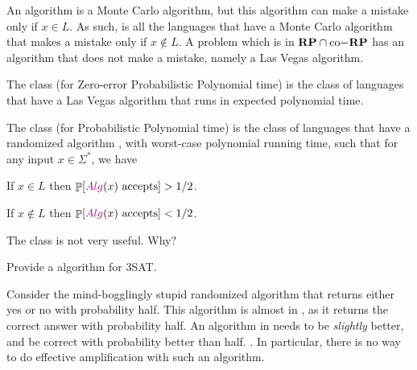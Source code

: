 An  algorithm is a Monte Carlo algorithm, but this
algorithm can make a mistake only if $x \in L$. As such, 
is all the languages that have a Monte Carlo algorithm that makes a
mistake only if $x \notin L$. A problem which is in $\mathbf{RP} \cap
\mathrm{co-}\mathbf{RP}$ has an algorithm that does not make a mistake, namely a
Las Vegas algorithm. 

\begin{defn}
    The class  (for Zero-error Probabilistic Polynomial
    time) is the class of languages that have a Las Vegas algorithm
    that runs in expected polynomial time.
\end{defn}


\begin{defn}
    The class \CClassPP (for Probabilistic Polynomial time) is the
    class of languages that have a randomized algorithm \Alg, with
    worst-case polynomial running time, such that for any input
    $x \in \Sigma^*$, we have
    \begin{compactenumi}
        \item If $x \in L$ then $\Prob{\MakeBig \Alg(x) \text{
              accepts}} > 1/2$.
     
        \item If $x \notin L$ then $\Prob{\MakeBig\Alg(x) \text{
              accepts}} < 1/2$.
    \end{compactenumi}
\end{defn}

The class \CClassPP is not very useful. Why?

\begin{exercise}
    Provide a \CClassPP algorithm for 3SAT.
\end{exercise}

Consider the mind-bogglingly stupid randomized algorithm that returns
either yes or no with probability half. This algorithm is almost in
\CClassPP, as it returns the correct answer with probability half. An
algorithm in \CClassPP needs to be \emph{slightly} better, and be
correct with probability better than half. . In particular, there is
no way to do effective amplification with such an algorithm.

